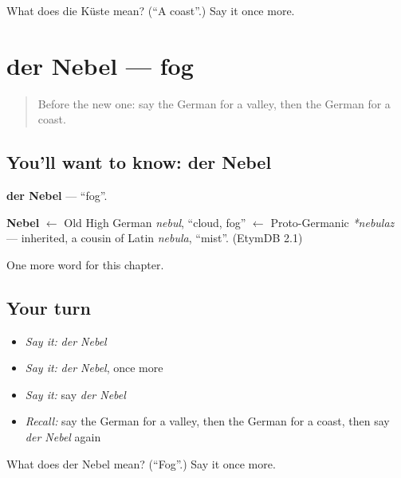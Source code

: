 \begin{tcolorbox}[breakable,colback=teal!4,colframe=teal!35!black,title={Before you move on}]
What does die Küste mean? (\textquotedblleft{}A coast\textquotedblright{}.) Say it once more.
\end{tcolorbox}
\section[der Nebel]{der Nebel — fog}

\label{lesson:GE-C197-nebel}



\begin{quote}
Before the new one: say the German for a valley, then the German for a coast.
\end{quote}

\subsection*{You'll want to know: der Nebel}
\textbf{der Nebel} — \textquotedblleft{}fog\textquotedblright{}.

\begin{cousinweb}
\textbf{Nebel} $\leftarrow$ Old High German \emph{nebul}, \textquotedblleft{}cloud, fog\textquotedblright{} $\leftarrow$ Proto-Germanic \emph{*nebulaz} — inherited, a cousin of Latin \emph{nebula}, \textquotedblleft{}mist\textquotedblright{}. (EtymDB 2.1)
\end{cousinweb}

\begin{grammarlens}[title={What you've built}]
One more word for this chapter.
\end{grammarlens}

\subsection*{Your turn}
\begin{itemize}
\raggedright
  \item \emph{Say it:} \emph{der Nebel}
  \item \emph{Say it:} \emph{der Nebel}, once more
  \item \emph{Say it:} say \emph{der Nebel}
  \item \emph{Recall:} say the German for a valley, then the German for a coast, then say \emph{der Nebel} again
\end{itemize}

\begin{tcolorbox}[breakable,colback=teal!4,colframe=teal!35!black,title={Before you move on}]
What does der Nebel mean? (\textquotedblleft{}Fog\textquotedblright{}.) Say it once more.
\end{tcolorbox}
